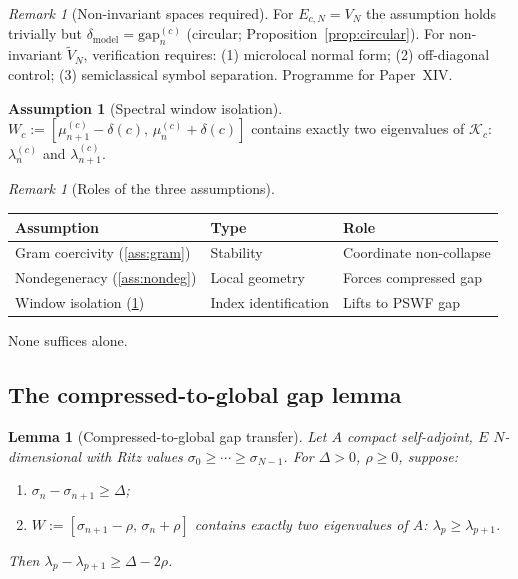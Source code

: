 \documentclass[12pt,a4paper]{amsart}
\newtheorem{lemma}[theorem]{Lemma}
\theoremstyle{definition}
\newtheorem{assumption}[theorem]{Assumption}
\theoremstyle{remark}
\newtheorem{remark}[theorem]{Remark}
\newcommand{\Kc}{\mathcal{K}_c}
\newcommand{\lam}[2]{\lambda_{#2}^{(#1)}}
\newcommand{\gap}[2]{\mathrm{gap}_{#2}^{(#1)}}
\begin{document}
\begin{remark}[Non-invariant spaces required]
For $E_{c,N} = V_N$ the assumption holds trivially but
$\delta_{\mathrm{model}} = \gap{c}{n}$ (circular;
Proposition~\ref{prop:circular}).
For non-invariant $\widetilde{V}_N$, verification requires:
(1) microlocal normal form; (2) off-diagonal control;
(3) semiclassical symbol separation. Programme for Paper~XIV.
\end{remark}

\begin{assumption}[Spectral window isolation]
\label{ass:window}
$W_c := [\mu_{n+1}^{(c)} - \delta(c),\, \mu_n^{(c)} + \delta(c)]$
contains exactly two eigenvalues of $\Kc$:
$\lam{c}{n}$ and $\lam{c}{n+1}$.
\end{assumption}

\begin{remark}[Roles of the three assumptions]
\label{rem:three-roles}
\begin{center}
\renewcommand{\arraystretch}{1.2}
\begin{tabular}{lll}
\toprule
\textbf{Assumption} & \textbf{Type} & \textbf{Role} \\
\midrule
Gram coercivity (\ref{ass:gram}) & Stability & Coordinate non-collapse \\
Nondegeneracy (\ref{ass:nondeg}) & Local geometry & Forces compressed gap \\
Window isolation (\ref{ass:window}) & Index identification & Lifts to PSWF gap \\
\bottomrule
\end{tabular}
\end{center}
None suffices alone.
\end{remark}

\subsection{The compressed-to-global gap lemma}

\begin{lemma}[Compressed-to-global gap transfer]
\label{lem:comptoglobal}
Let $A$ compact self-adjoint, $E$ $N$-dimensional with Ritz values
$\sigma_0 \geq \cdots \geq \sigma_{N-1}$.
For $\Delta > 0$, $\rho \geq 0$, suppose:
\begin{enumerate}[label=(C\arabic*),nosep]
  \item $\sigma_n - \sigma_{n+1} \geq \Delta$;\label{C1}
  \item $W := [\sigma_{n+1}-\rho,\, \sigma_n+\rho]$ contains exactly
    two eigenvalues of $A$: $\lambda_p \geq \lambda_{p+1}$.\label{C2}
\end{enumerate}
Then $\lambda_p - \lambda_{p+1} \geq \Delta - 2\rho$.
\end{lemma}
\end{document}
